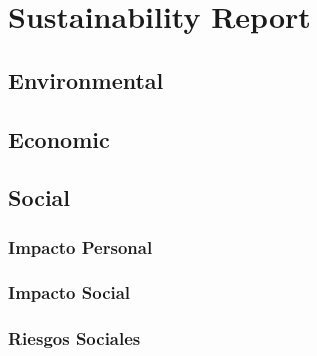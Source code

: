 
\chapter{Sustainability Report} %

\label{Chapter6} %


\section{Environmental}
\section{Economic}
\section{Social}
  \subsection{Impacto Personal}
  \subsection{Impacto Social}
  \subsection{Riesgos Sociales}
